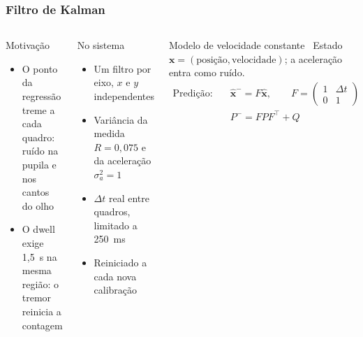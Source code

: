 \documentclass{UnBeamer}
\begin{document}
\subsubsection{Filtro de Kalman}
\begin{frame}
    \scriptsize
    \begin{columns}[T]
            \begin{alertblock}{Motivação}
                \begin{itemize}
                    \item O ponto da regressão treme a cada quadro: ruído na
                          pupila e nos cantos do olho
                    \item O dwell exige 1,5~s na mesma região: o tremor
                          reinicia a contagem
                \end{itemize}
            \end{alertblock}
            \begin{exampleblock}{No sistema}
                \begin{itemize}
                    \item Um filtro por eixo, $x$ e $y$ independentes
                    \item Variância da medida $R = 0{,}075$ e da
                          aceleração $\sigma_a^2 = 1$
                    \item $\Delta t$ real entre quadros, limitado a 250~ms
                    \item Reiniciado a cada nova calibração
                \end{itemize}
            \end{exampleblock}
            \begin{block}{Modelo de velocidade constante~\cite{kalman}}
                Estado $\mathbf{x} = (\text{posição}, \text{velocidade})$;
                a aceleração entra como ruído.
                \vspace{-1ex}
                \begin{align*}
                    \text{Predição:}\quad
                    & \hat{\mathbf{x}}^- = F\hat{\mathbf{x}}, \qquad
                      F = \begin{pmatrix} 1 & \Delta t \\ 0 & 1 \end{pmatrix} \\
                    & P^- = F P F^\top + Q \\[1ex]

\end{align*}
\end{block}
\end{columns}
\end{frame}
\end{document}
